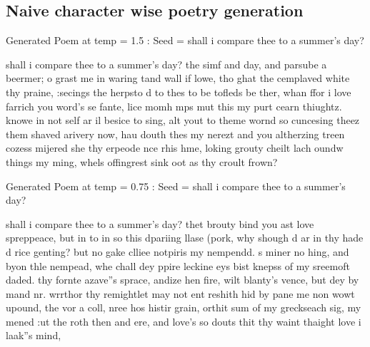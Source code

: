 \subsection*{Naive character wise poetry generation}

\noindent Generated Poem at temp =  1.5 :\newline
Seed =  shall i compare thee to a summer's day?

\noindent shall i compare thee to a summer's day? \newline
the simf and day, and parsube a beermer;  \newline
o grast me in waring tand wall if lowe,  \newline
tho ghat the cemplaved white thy praine,  \newline
:secings the herpsto d to thes to be tofleds be ther,  \newline
whan ffor i love farrich you word's se fante,  \newline
lice momh mps mut this my purt cearn thiughtz.  \newline
  knowe in not self ar il besice to sing,  \newline
alt yout to theme wornd so cuncesing theez  \newline
them shaved arivery now,  \newline
hau douth thes my nerezt and you altherzing treen  \newline
cozess mijered she thy erpeode nce rhis hme, \newline
loking grouty cheilt lach oundw things my ming,  \newline
whels offingrest sink oot as thy croult frown? 

\noindent Generated Poem at temp =  0.75 :\newline
Seed =  shall i compare thee to a summer's day?

\noindent shall i compare thee to a summer's day? \newline
thet brouty bind you ast love spreppeace, \newline
but in to in so this dpariing llase (pork, \newline
why shough d ar in thy hade d rice genting? \newline
but no gake clliee notpiris my nempendd. \newline
s miner no hing, and byon thle nempead, \newline
whe chall dey ppire leckine eys bist knepss of my sreemoft daded. \newline
thy fornte azave''s sprace, andize hen fire, \newline
wilt blanty's vence, but dey by mand nr. \newline
  wrrthor thy remightlet may not ent reshith hid  \newline
by pane me non wowt upound, \newline
the vor a coll, nree hos histir grain, \newline
orthit sum of my greckseach sig, my mened \newline
:ut the roth then and ere, \newline
and love's so douts thit thy waint thaight love i laak''s mind, 

